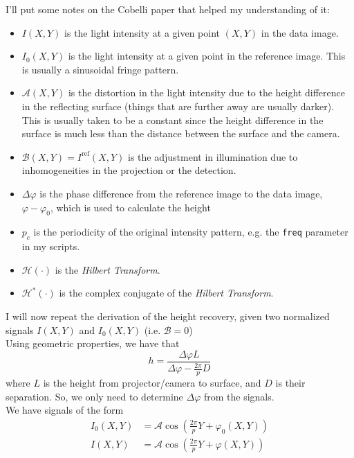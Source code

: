 \documentclass[11pt]{article}
\begin{document}
I'll put some notes on the Cobelli paper that helped my understanding of it:
\begin{itemize}
  \item $I(X,Y)$ is the light intensity at a given point $(X,Y)$ in the data image.

  \item $I_0(X,Y)$ is the light intensity at a given point in the reference image. This is usually a sinusoidal fringe pattern.

  \item $\mathcal{A}(X,Y)$ is the distortion in the light intensity due to the height difference in the reflecting surface (things that are further away are usually darker). This is usually taken to be a constant since the height difference in the surface is much less than the distance between the surface and the camera.

  \item $\mathcal{B}(X,Y) = I^{\text{ref}}(X,Y)$ is the adjustment in illumination due to inhomogeneities in the projection or the detection.

  \item $\Delta\varphi$ is the phase difference from the reference image to the data image, $\varphi - \varphi_0$, which is used to calculate the height

  \item $p_c$ is the periodicity of the original intensity pattern, e.g. the \texttt{freq} parameter in my scripts.

  \item $\mathcal{H}(\cdot)$ is the \textit{Hilbert Transform}.

  \item $\mathcal{H}^{*}(\cdot)$ is the complex conjugate of the \textit{Hilbert Transform}.
\end{itemize}

I will now repeat the derivation of the height recovery, given two normalized signals $I(X,Y)$ and $I_0(X,Y)$ (i.e.  $\mathcal{B} = 0$)\\

Using geometric properties, we have that
\[
h = \frac{\Delta \varphi L}{\Delta \varphi - \frac{2 \pi}{p} D}
\]
where $L$ is the height from projector/camera to surface, and $D$ is their separation. So, we only need to determine $\Delta \varphi$ from the signals.\\

We have signals of the form
\begin{align*}
  I_0(X,Y) &= \mathcal{A}\cos \left(\frac{2\pi}{p}Y + \varphi_0 (X,Y)\right)\\
  I(X,Y) &= \mathcal{A}\cos \left(\frac{2\pi}{p}Y + \varphi (X,Y)\right)
\end{align*}
\end{document}
